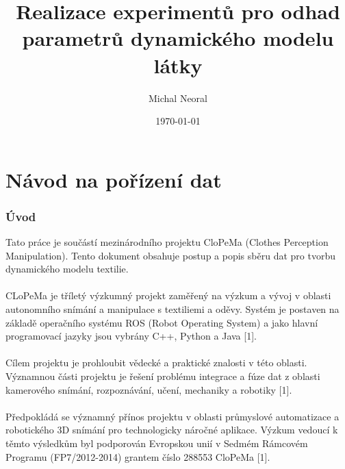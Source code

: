 \documentclass[10pt,a4paper,titlepage,oneside]{book}
\begin{document}
\title{Realizace experimentů pro odhad parametrů dynamického modelu látky}
\author{Michal Neoral}
\date{\today{}}
\maketitle

\thispagestyle{fancy}

\part*{Návod na pořízení dat}


\section*{Úvod}

Tato práce je součástí mezinárodního projektu CloPeMa (Clothes Perception Manipulation). Tento dokument obsahuje postup a popis sběru dat pro tvorbu dynamického modelu textilie.\\
\\
CLoPeMa je tříletý výzkumný projekt zaměřený na výzkum a vývoj v oblasti autonomního snímání a manipulace s textiliemi a oděvy. Systém je postaven na základě operačního systému ROS (Robot Operating System) a jako hlavní programovací jazyky jsou vybrány C++, Python a Java [1].\\
\\
Cílem projektu je prohloubit vědecké a praktické znalosti v této oblasti. Významnou části projektu je řešení problému integrace a fúze dat z oblasti kamerového snímání, rozpoznávání, učení, mechaniky a robotiky [1].\\
\\
Předpokládá se významný přínos projektu v oblasti průmyslové automatizace a robotického 3D snímání pro technologicky náročné aplikace. Výzkum vedoucí k těmto výsledkům byl podporován Evropskou unií v Sedmém Rámcovém Programu (FP7/2012-2014) grantem číslo 288553 CloPeMa [1].\\
\\
\end{document}
